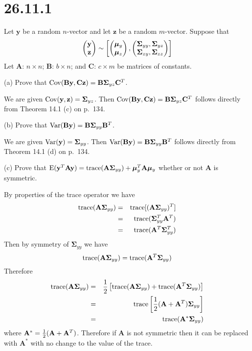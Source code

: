 \section*{26.11.1}
Let $\mathbf y$ be a random $n$-vector and let $\mathbf z$
be a random $m$-vector. Suppose that
\[
\begin{pmatrix}
\mathbf y\cr
\mathbf z
\end{pmatrix}\sim\left[
\begin{pmatrix}
\bm\mu_y\cr
\bm\mu_z
\end{pmatrix},\begin{pmatrix}
\bm\Sigma_{yy},\bm\Sigma_{yz}\cr
\bm\Sigma_{zy},\bm\Sigma_{zz}
\end{pmatrix}
\right]
\]
Let $\mathbf A$: $n\times n$;
$\mathbf B$: $b\times n$;
and $\mathbf C$: $c\times m$ be matrices of constants.

\bigskip
\noindent
(a) Prove that $\mathop{\rm Cov}(\mathbf{By},\mathbf{Cz})
=\mathbf{B\Sigma}_{yz}\mathbf C^T$.

\bigskip
\noindent
We are given $\mathop{\rm Cov}(\mathbf y,\mathbf z)=\bm\Sigma_{yz}$.
Then $\mathop{\rm Cov}(\mathbf{By},\mathbf{Cz})
=\mathbf{B\Sigma}_{yz}\mathbf C^T$
follows directly from Theorem 14.1 (c) on p.\ 134.

\bigskip
\noindent
(b) Prove that $\mathop{\rm Var}(\mathbf{By})
=\mathbf{B\Sigma}_{yy}\mathbf B^T$.

\bigskip
\noindent
We are given $\mathop{\rm Var}(\mathbf y)=\bm\Sigma_{yy}$.
Then $\mathop{\rm Var}(\mathbf{By})
=\mathbf{B\Sigma}_{yy}\mathbf B^T$
follows directly from Theorem 14.1 (d) on p.\ 134.

\bigskip
\noindent
(c) Prove that
$\mathrm E(\mathbf y^T\mathbf{Ay})
=\mathop{\rm trace}(\mathbf{A\Sigma}_{yy})
+\bm\mu_y^T\mathbf A\bm\mu_y$
whether or not $\mathbf A$ is symmetric.

\bigskip
\noindent
By properties of the trace operator we have
\begin{eqnarray*}
\mathop{\rm trace}(\mathbf A\bm\Sigma_{yy})
&=&\mathop{\rm trace}[(\mathbf A\bm\Sigma_{yy})^T]\\
&=&\mathop{\rm trace}(\bm\Sigma_{yy}^T\mathbf A^T)\\
&=&\mathop{\rm trace}(\mathbf A^T\bm\Sigma_{yy}^T)
\end{eqnarray*}
Then by symmetry of $\bm\Sigma_{yy}$ we have
$$
\mathop{\rm trace}(\mathbf A\bm\Sigma_{yy})
=\mathop{\rm trace}(\mathbf A^T\bm\Sigma_{yy})
$$
Therefore
\begin{eqnarray*}
\mathop{\rm trace}(\mathbf{A\Sigma}_{yy})
&=&
{1\over2}\left[
\mathop{\rm trace}(\mathbf{A\Sigma}_{yy})
+
\mathop{\rm trace}(\mathbf A^T\bm\Sigma_{yy})
\right]\\
&=&
\mathop{\rm trace}\left[
{1\over2}(\mathbf A+\mathbf A^T)\bm\Sigma_{yy}
\right]\\
&=&\mathop{\rm trace}(\mathbf A^*\bm\Sigma_{yy})
\end{eqnarray*}
where $\mathbf A^*={1\over2}(\mathbf A+\mathbf A^T)$.
Therefore if $\mathbf A$ is not symmetric then it can be replaced
with $\mathbf A^*$ with no change to the value of the trace.


